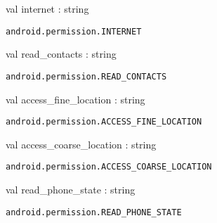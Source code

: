 \documentclass[11pt]{article}
\begin{document}
\begin{ocamldocsigend}


\label{val:Android.Permission.internet}\begin{ocamldoccode}
val internet : string
\end{ocamldoccode}
\begin{ocamldocdescription}
{\tt{android.permission.INTERNET}}


\end{ocamldocdescription}


\label{val:Android.Permission.read-underscorecontacts}\begin{ocamldoccode}
val read_contacts : string
\end{ocamldoccode}
\begin{ocamldocdescription}
{\tt{android.permission.READ\_CONTACTS}}


\end{ocamldocdescription}


\label{val:Android.Permission.access-underscorefine-underscorelocation}\begin{ocamldoccode}
val access_fine_location : string
\end{ocamldoccode}
\begin{ocamldocdescription}
{\tt{android.permission.ACCESS\_FINE\_LOCATION}}


\end{ocamldocdescription}


\label{val:Android.Permission.access-underscorecoarse-underscorelocation}\begin{ocamldoccode}
val access_coarse_location : string
\end{ocamldoccode}
\begin{ocamldocdescription}
{\tt{android.permission.ACCESS\_COARSE\_LOCATION}}


\end{ocamldocdescription}


\label{val:Android.Permission.read-underscorephone-underscorestate}\begin{ocamldoccode}
val read_phone_state : string
\end{ocamldoccode}
\begin{ocamldocdescription}
{\tt{android.permission.READ\_PHONE\_STATE}}



\end{ocamldocdescription}
\end{ocamldocsigend}
\end{document}

